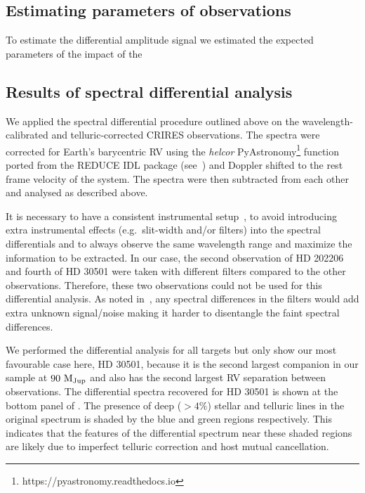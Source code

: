 




\subsection{Estimating parameters of observations}
To estimate the differential amplitude signal we estimated the expected parameters of the impact of the




\subsection{Results of spectral differential analysis}
\label{subsec:_differential_results}

We applied the spectral differential procedure outlined above on the wavelength-calibrated and telluric-corrected {CRIRES} observations. The spectra were corrected for Earth's barycentric {RV} using the \emph{helcor} PyAstronomy\footnote{https://pyastronomy.readthedocs.io} function ported from the REDUCE IDL package (see~\citet[][]{piskunov_new_2002}) and Doppler shifted to the rest frame velocity of the system. The spectra were then subtracted from each other and analysed as described above.


It is necessary to have a consistent instrumental setup~\citet{ferluga_separating_1997}, to avoid introducing extra instrumental effects (e.g.\ slit-width and/or filters) into the spectral differentials and to always observe the same wavelength range and maximize the information to be extracted. In our case, the second observation of {HD 202206} and fourth of {HD 30501} were taken with different filters compared to the other observations. Therefore, these two observations could not be used for this differential analysis. As noted in~\citep{hadrava_disentangling_2009}, any spectral differences in the filters would add extra unknown signal/noise making it harder to disentangle the faint spectral differences.


We performed the differential analysis for all targets but only show our most favourable case here, {HD 30501}, because it is the second largest companion in our sample at \(\rm 90~M_{Jup}\) and also has the second largest {RV} separation between observations. The differential spectra recovered for {HD 30501} is shown at the bottom panel of . The presence of deep (\(>4\%\)) stellar and telluric lines in the original spectrum is shaded by the blue and green regions respectively. This indicates that the features of the differential spectrum near these shaded regions are likely due to imperfect telluric correction and host mutual cancellation.

